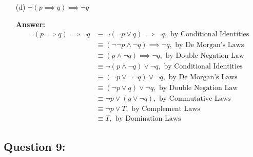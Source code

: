 \documentclass[12pt]{extreport}
\newcommand{\answer}[0]{\medskip \textbf{Answer:} \medskip}
\begin{document}
\begin{enumerate}
\begin{enumerate}
            \item[(d)] \( \neg (p \implies q) \implies \neg q \)
            
                \answer
                \begin{align*}
                    \neg (p \implies q) \implies \neg q &\equiv \neg (\neg p \lor q) \implies \neg q, \text{ by Conditional Identities} \\
                                                        &\equiv (\neg \neg p \land \neg q) \implies \neg q, \text{ by De Morgan's Laws} \\
                                                        &\equiv (p \land \neg q) \implies \neg q, \text{ by Double Negation Law} \\
                                                        &\equiv \neg(p \land \neg q) \lor \neg q, \text{ by Conditional Identities} \\
                                                        &\equiv (\neg p \lor \neg \neg q) \lor \neg q, \text{ by De Morgan's Laws} \\
                                                        &\equiv (\neg p \lor q) \lor \neg q, \text{ by Double Negation Law} \\
                                                        &\equiv \neg p \lor (q \lor \neg q), \text{ by Commutative Laws} \\
                                                        &\equiv \neg p \lor T, \text{ by Complement Laws} \\
                                                        &\equiv T, \text{ by Domination Laws}
                \end{align*}

        \end{enumerate}

\end{enumerate}
\newpage

\subsection*{Question 9:}
\end{document}
